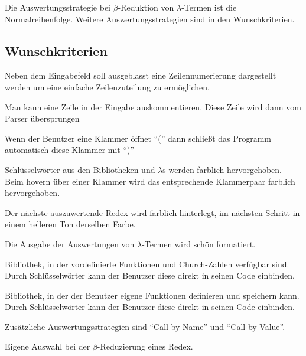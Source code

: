 \documentclass[parskip=full,11pt,twoside]{scrartcl}
\begin{document}
Die Auswertungsstrategie bei $\beta$-Reduktion von $\lambda$-Termen ist die Normalreihenfolge. Weitere Auswertungsstrategien sind in den Wunschkriterien.


\newpage
\subsection{Wunschkriterien}

Neben dem Eingabefeld soll ausgeblasst eine Zeilennumerierung dargestellt werden um eine einfache Zeilenzuteilung zu ermöglichen.

Man kann eine Zeile in der Eingabe auskommentieren. Diese Zeile wird dann vom Parser übersprungen

Wenn der Benutzer eine Klammer öffnet \enquote{(} dann schließt das Programm automatisch diese Klammer mit \enquote{)}

Schlüsselwörter aus den Bibliotheken und $\lambda$s werden farblich hervorgehoben. Beim hovern über einer Klammer wird das entsprechende Klammerpaar farblich hervorgehoben.

Der nächste auszuwertende Redex wird farblich hinterlegt, im nächsten Schritt in einem helleren Ton derselben Farbe.

Die Ausgabe der Auswertungen von $\lambda$-Termen wird schön formatiert.

Bibliothek, in der vordefinierte Funktionen und Church-Zahlen verfügbar sind. Durch Schlüsselwörter kann der Benutzer diese direkt in seinen Code einbinden.

Bibliothek, in der der Benutzer eigene Funktionen definieren und speichern kann. Durch Schlüsselwörter kann der Benutzer diese direkt in seinen Code einbinden.

Zusätzliche Auswertungsstrategien sind \enquote{Call by Name} und \enquote{Call by Value}.

Eigene Auswahl bei der $\beta$-Reduzierung eines Redex.
\end{document}
